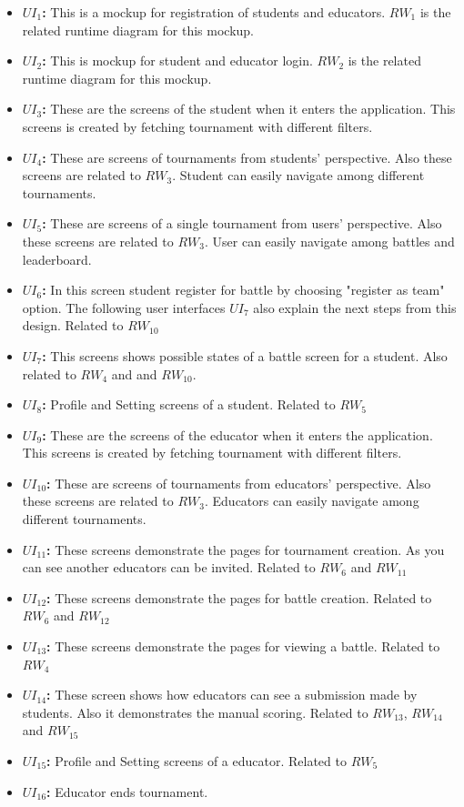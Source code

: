 \begin{itemize}
    \item \textbf{$UI_{1}$:} This is a mockup for registration of students and educators. $RW_{1}$ is the related runtime diagram for this mockup.
    \item \textbf{$UI_{2}$:} This is mockup for student and educator login. $RW_{2}$ is the related runtime diagram for this mockup.
    \item \textbf{$UI_{3}$:} These are the screens of the student when it enters the application. This screens is created by fetching tournament with different filters.
    \item \textbf{$UI_{4}$:} These are screens of tournaments from students' perspective. Also these screens are related to  $RW_{3}$. Student can easily navigate among different tournaments.
    \item \textbf{$UI_{5}$:} These are screens of a single tournament from users' perspective. Also these screens are related to  $RW_{3}$. User can easily navigate among battles and leaderboard.
    \item \textbf{$UI_{6}$:} In this screen student register for battle by choosing "register as team" option. The following user interfaces $UI_{7}$ also explain the next steps from this design. Related to $RW_{10}$
    \item \textbf{$UI_{7}$:} This screens shows possible states of a battle screen for a student. Also related to $RW_{4}$ and and $RW_{10}$.
    \item \textbf{$UI_{8}$:} Profile and Setting screens of a student. Related to $RW_{5}$
    \item \textbf{$UI_{9}$:} These are the screens of the educator when it enters the application. This screens is created by fetching tournament with different filters.
    \item \textbf{$UI_{10}$:} These are screens of tournaments from educators' perspective. Also these screens are related to  $RW_{3}$. Educators can easily navigate among different tournaments.
    \item \textbf{$UI_{11}$:} These screens demonstrate the pages for tournament creation. As you can see another educators can be invited. Related to $RW_{6}$ and $RW_{11}$
    \item \textbf{$UI_{12}$:} These screens demonstrate the pages for battle creation. Related to $RW_{6}$ and $RW_{12}$
    \item \textbf{$UI_{13}$:} These screens demonstrate the pages for viewing a battle.  Related to $RW_{4}$
    \item \textbf{$UI_{14}$:} These screen shows how educators can see a submission made by students. Also it demonstrates the manual scoring.
    Related to $RW_{13}$, $RW_{14}$ and $RW_{15}$
    \item \textbf{$UI_{15}$:} Profile and Setting screens of a educator. Related to $RW_{5}$
    \item \textbf{$UI_{16}$:} Educator ends tournament.
\end{itemize}

\newpage
